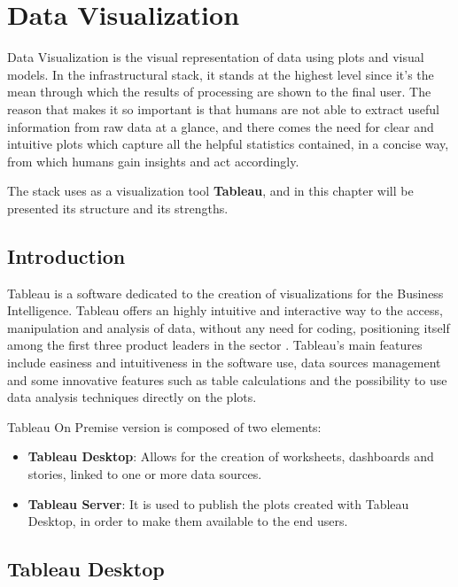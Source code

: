 \chapter{Data Visualization}

Data Visualization is the visual representation of data using plots and visual models. In the infrastructural stack, it stands at the highest level since it's the mean through which the results of processing are shown to the final user. The reason that makes it so important is that humans are not able to extract useful information from raw data at a glance, and there comes the need for clear and intuitive plots which capture all the helpful statistics contained, in a concise way, from which humans gain insights and act accordingly.

The stack uses as a visualization tool \textbf{Tableau}, and in this chapter will be presented its structure and its strengths. 

\section{Introduction}

Tableau is a software dedicated to the creation of visualizations for the Business Intelligence. Tableau offers an highly intuitive and interactive way to the access, manipulation and analysis of data, without any need for coding, positioning itself among the first three product leaders in the sector \cite{gartner_tableau}. Tableau's main features include easiness and intuitiveness in the software use, data sources management and some innovative features such as table calculations and the possibility to use data analysis techniques directly on the plots.

Tableau On Premise version is composed of two elements:

\begin{itemize}
    \item \textbf{Tableau Desktop}: Allows for the creation of worksheets, dashboards and stories, linked to one or more data sources.
    \item \textbf{Tableau Server}: It is used to publish the plots created with Tableau Desktop, in order to make them available to the end users.
\end{itemize}

\section{Tableau Desktop}

